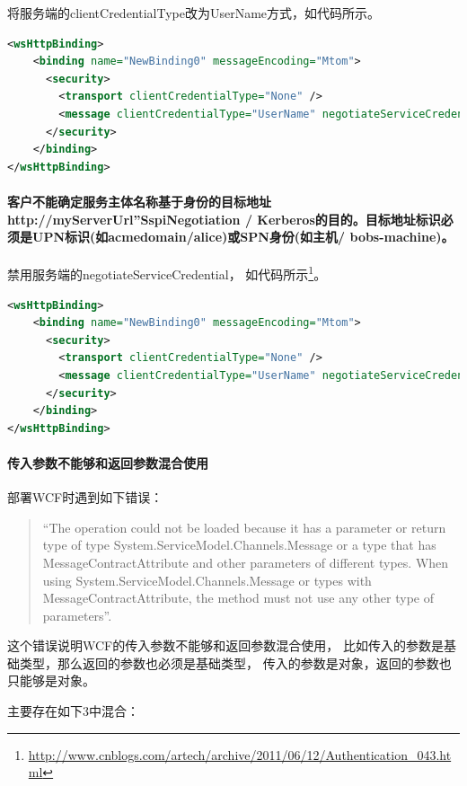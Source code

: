 \documentclass{book}
\begin{document}
将服务端的clientCredentialType改为UserName方式，如代码所示。

\begin{lstlisting}[language=XML]
<wsHttpBinding>
	<binding name="NewBinding0" messageEncoding="Mtom">
	  <security>
	    <transport clientCredentialType="None" />
	    <message clientCredentialType="UserName" negotiateServiceCredential="false"/>
	  </security>
	</binding>
</wsHttpBinding>
\end{lstlisting}

\paragraph{客户不能确定服务主体名称基于身份的目标地址http://myServerUrl”SspiNegotiation / Kerberos的目的。目标地址标识必须是UPN标识(如acmedomain/alice)或SPN身份(如主机/ bobs-machine)。}

禁用服务端的negotiateServiceCredential，
如代码所示\footnote{\url{http://www.cnblogs.com/artech/archive/2011/06/12/Authentication_043.html}}。

\begin{lstlisting}[language=XML]
<wsHttpBinding>
	<binding name="NewBinding0" messageEncoding="Mtom">
	  <security>
	    <transport clientCredentialType="None" />
	    <message clientCredentialType="UserName" negotiateServiceCredential="false"/>
	  </security>
	</binding>
</wsHttpBinding>
\end{lstlisting}

\paragraph{传入参数不能够和返回参数混合使用}

部署WCF时遇到如下错误：

\begin{quotation}
“The operation could not be loaded because it has a parameter or return type of type System.ServiceModel.Channels.Message or a type that has MessageContractAttribute and other parameters of different types. When using System.ServiceModel.Channels.Message or types with MessageContractAttribute, the method must not use any other type of parameters”.
\end{quotation}

这个错误说明WCF的传入参数不能够和返回参数混合使用，
比如传入的参数是基础类型，那么返回的参数也必须是基础类型，
传入的参数是对象，返回的参数也只能够是对象。

主要存在如下3中混合：
\end{document}
